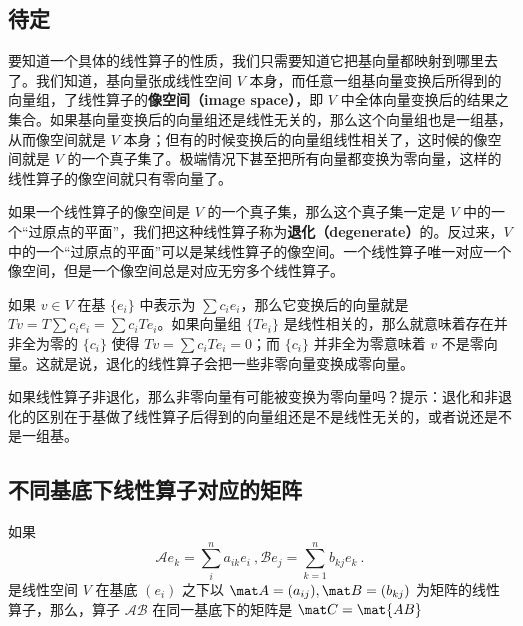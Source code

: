 \subsection{待定}



要知道一个具体的线性算子的性质，我们只需要知道它把基向量都映射到哪里去了。我们知道，基向量张成线性空间 $V$ 本身，而任意一组基向量变换后所得到的向量组，了线性算子的\textbf{像空间（image space）}，即 $V$ 中全体向量变换后的结果之集合。如果基向量变换后的向量组还是线性无关的，那么这个向量组也是一组基，从而像空间就是 $V$ 本身；但有的时候变换后的向量组线性相关了，这时候的像空间就是 $V$ 的一个真子集了。极端情况下甚至把所有向量都变换为零向量，这样的线性算子的像空间就只有零向量了。

如果一个线性算子的像空间是 $V$ 的一个真子集，那么这个真子集一定是 $V$ 中的一个“过原点的平面”，我们把这种线性算子称为\textbf{退化（degenerate）}的。反过来，$V$ 中的一个“过原点的平面”可以是某线性算子的像空间。一个线性算子唯一对应一个像空间，但是一个像空间总是对应无穷多个线性算子。

如果 $v\in V$ 在基 $\{{e}_i\}$ 中表示为 $\sum c_i {e}_i$，那么它变换后的向量就是 $T v=T\sum c_i {e}_i=\sum c_iT {e}_i$。如果向量组 $\{T {e}_i\}$ 是线性相关的，那么就意味着存在并非全为零的 $\{c_i\}$ 使得 $T v=\sum c_iT {e}_i=0$；而 $\{c_i\}$ 并非全为零意味着 $v$ 不是零向量。这就是说，退化的线性算子会把一些非零向量变换成零向量。

\begin{exercise}{}
如果线性算子非退化，那么非零向量有可能被变换为零向量吗？提示：退化和非退化的区别在于基做了线性算子后得到的向量组还是不是线性无关的，或者说还是不是一组基。
\end{exercise}

\subsection{不同基底下线性算子对应的矩阵}\label{sub_LiOper_1}


\begin{theorem}{}\label{the_LiOper_1}
如果
\begin{equation}
\mathcal{A} e_k = \sum_i^{n}a_{ik} e_i~, \mathcal{B} e_j = \sum_{k=1}^n b_{kj} e_k~.
\end{equation}
是线性空间 $V$ 在基底 $( e_i)$ 之下以 $\mat A=(a_{ij}), \mat B=(b_{kj})$ 为矩阵的线性算子，那么，算子 $\mathcal{AB}$ 在同一基底下的矩阵是 $\mat C=\mat{AB}$
\end{theorem}

